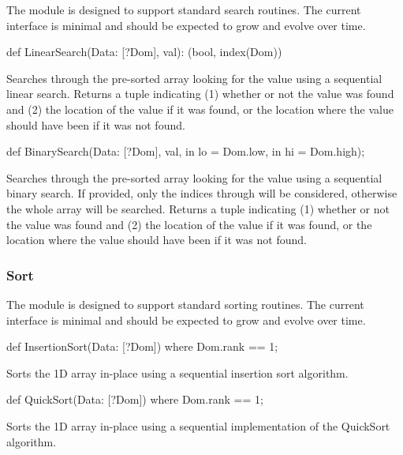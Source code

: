 The  module is designed to support standard search
routines.  The current interface is minimal and should be expected to
grow and evolve over time.

\begin{protohead}
def LinearSearch(Data: [?Dom], val): (bool, index(Dom))
\end{protohead}
\begin{protobody}
Searches through the pre-sorted array  looking for the
value  using a sequential linear search.  Returns a tuple
indicating (1) whether or not the value was found and (2) the location
of the value if it was found, or the location where the value should
have been if it was not found.
\end{protobody}


\begin{protohead}
def BinarySearch(Data: [?Dom], val, in lo = Dom.low, in hi = Dom.high);
\end{protohead}
\begin{protobody}
Searches through the pre-sorted array  looking for the
value  using a sequential binary search.  If provided, only
the indices  through  will be considered, otherwise
the whole array will be searched.  Returns a tuple indicating (1)
whether or not the value was found and (2) the location of the value
if it was found, or the location where the value should have been if
it was not found.
\end{protobody}


\subsubsection{Sort}
\label{Sort}

The  module is designed to support standard sorting
routines.  The current interface is minimal and should be expected to
grow and evolve over time.

\begin{protohead}
def InsertionSort(Data: [?Dom]) where Dom.rank == 1;
\end{protohead}
\begin{protobody}
Sorts the 1D array  in-place using a sequential insertion
sort algorithm.
\end{protobody}

\begin{protohead}
def QuickSort(Data: [?Dom]) where Dom.rank == 1;
\end{protohead}
\begin{protobody}
Sorts the 1D array  in-place using a sequential
implementation of the QuickSort algorithm.
\end{protobody}

